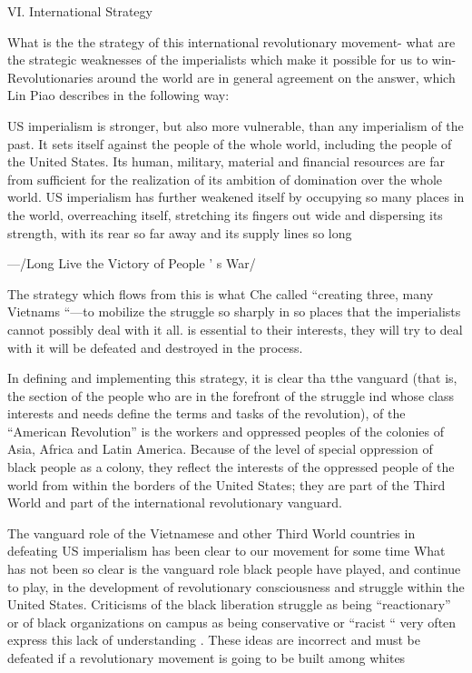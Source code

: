 \documentclass[12pt, titlepage]{article}
\begin{document}
{\begin{spacing}{1.10}
\begin{center}
VI. International Strategy
\end{center}

What is the the strategy of this international revolutionary movement- what are the strategic weaknesses of the imperialists which make it possible for us to win- Revolutionaries around the world are in general agreement on the answer, which Lin Piao describes in the following way: 

US imperialism is stronger, but also more vulnerable, than any imperialism of the past. It sets itself against the people of the whole world, including the people of the United States. Its human, military, material and financial resources are far from sufficient for the realization of its ambition of domination over the whole world. US imperialism has further weakened itself by occupying so many places in the world, overreaching itself, stretching its fingers out wide and dispersing its strength, with its rear so far away and its supply lines so long 

 —/Long Live the Victory of People ' s War/
 
The strategy which flows from this is what Che called ``creating three, many Vietnams ``—to mobilize the struggle so sharply in so places that the imperialists cannot possibly deal with it all. is essential to their interests, they will try to deal with it will be defeated and destroyed in the process. 

In defining and implementing this strategy, it is clear tha tthe vanguard (that is, the section of the people who are in the forefront of the struggle ind whose class interests and needs define the terms and tasks of the revolution), of the ``American Revolution'' is the workers and oppressed peoples of the colonies of Asia, Africa and Latin America. Because of the level of special oppression of black people as a colony, they reflect the interests of the oppressed people of the world from within the borders of the United States; they are part of the Third World and part of the international revolutionary vanguard.

The vanguard role of the Vietnamese and other Third World countries in defeating US imperialism has been clear to our movement for some time What has not been so clear is the vanguard role black people have played, and continue to play, in the development of revolutionary consciousness and struggle within the United States. Criticisms of the black liberation struggle as being ``reactionary'' or of black organizations on campus as being conservative or ``racist `` very often express this lack of understanding . These ideas are incorrect and must be defeated if a revolutionary movement is going to be built among whites


\end{spacing}}
\end{document}
